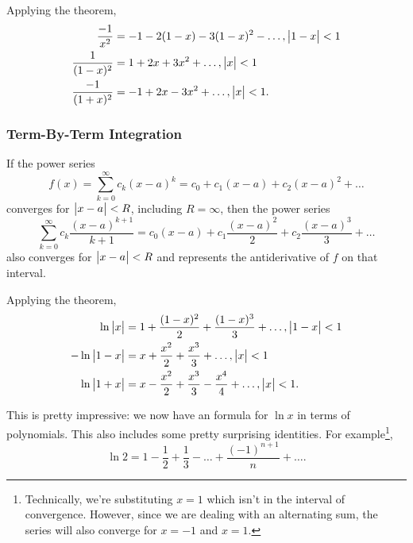 Applying the theorem,
\begin{align*}
	\frac{-1}{x^2} &= -1 - 2(1-x) - 3(1-x)^2 - \ldots, \big\lvert 1-x \big\rvert < 1 \\
	\frac{1}{(1-x)^2} &= 1 + 2x + 3x^2 + \ldots, \big\lvert x \big\rvert < 1 \\
	\frac{-1}{(1+x)^2} &= -1 + 2x - 3x^2 + \ldots, \big\lvert x \big\rvert < 1.
\end{align*}

\subsubsection{Term-By-Term Integration}
\begin{theorem}
	If the power series
	\begin{equation*}
		f(x) = \sum_{k=0}^{\infty}{c_k(x-a)^k} = c_0 + c_1(x-a) + c_2(x-a)^2 + \ldots
	\end{equation*}
	converges for $\big\lvert x-a \big\rvert < R$, including $R=\infty$, then the power series
	\begin{equation*}
		\sum_{k=0}^{\infty}{c_k\frac{(x-a)^{k+1}}{k+1}} = c_0(x-a) + c_1\frac{(x-a)^2}{2} + c_2\frac{(x-a)^3}{3} + \ldots
	\end{equation*}
	also converges for $\big\lvert x-a \big\rvert < R$ and represents the antiderivative of $f$ on that interval.
\end{theorem}

Applying the theorem,
\begin{align*}
	\ln{\big\lvert x \big\rvert} &= 1 + \frac{(1-x)^2}{2} + \frac{(1-x)^3}{3} + \ldots, \big\lvert 1-x \big\rvert < 1 \\
	-\ln{\big\lvert 1-x \big\rvert} &= x + \frac{x^2}{2} + \frac{x^3}{3} + \ldots, \big\lvert x \big\rvert < 1 \\
	\ln{\big\lvert 1+x \big\rvert} &= x - \frac{x^2}{2} + \frac{x^3}{3} - \frac{x^4}{4} + \ldots, \big\lvert x \big\rvert < 1.
\end{align*}

This is pretty impressive: we now have an formula for $\ln{x}$ in terms of polynomials.
This also includes some pretty surprising identities.
For example\footnote{Technically, we're substituting $x=1$ which isn't in the interval of convergence. However, since we are dealing with an alternating sum, the series will also converge for $x=-1$ and $x=1$.},
\begin{equation*}
	\ln{2} = 1 - \frac{1}{2} + \frac{1}{3} - \ldots + \frac{(-1)^{n+1}}{n} + \ldots.
\end{equation*}

